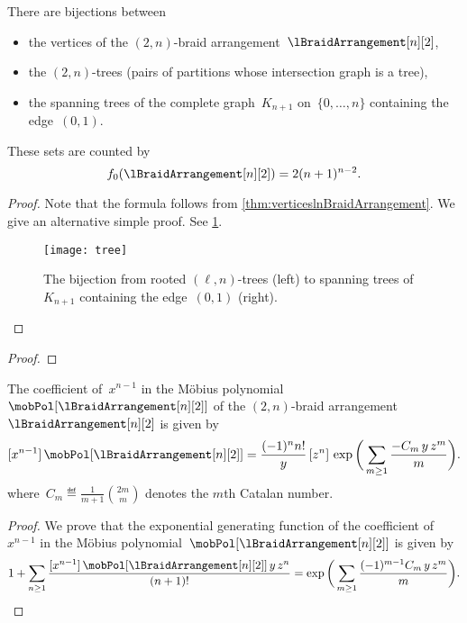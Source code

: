 \begin{theorem}
\label{thm:vertices2nBraidArrangement}
There are bijections between
\begin{itemize}
\item the vertices of the $(2,n)$-braid arrangement~$\lBraidArrangement[n][2]$,
\item the $(2,n)$-trees (\ie pairs of partitions whose intersection graph is a tree),
\item the spanning trees of the complete graph~$K_{n+1}$ on~$\{0, \dots, n\}$ containing the edge~$(0,1)$.
\end{itemize}
These sets are counted by
\[
f_0(\lBraidArrangement[n][2]) = 2 (n + 1)^{n-2}.
\]
\end{theorem}

\begin{proof}
Note that the formula follows from \cref{thm:verticeslnBraidArrangement}.
We give an alternative simple proof.
See \cref{fig:tree}.
%
\begin{figure}
	\centerline{\texttt{[image: tree]}}
	\caption{The bijection from rooted $(\ell,n)$-trees (left) to spanning trees of~$K_{n+1}$ containing the edge~$(0,1)$ (right).}
	\label{fig:tree}
\end{figure}
\end{proof}

\begin{theorem}
\label{thm:verticesRefinedlnBraidArrangement}
\end{theorem}

\begin{proof}
\end{proof}

\begin{theorem}
\label{thm:facets2nBraidArrangement}
The coefficient of~$x^{n-1}$ in the M\"obius polynomial~$\mobPol[{\lBraidArrangement[n][2]}]$ of the $(2,n)$-braid arrangement~$\lBraidArrangement[n][2]$ is given by
\[
[x^{n-1}] \, \mobPol[{\lBraidArrangement[n][2]}] = \frac{(-1)^n n!}{y} \, [z^n] \, \exp \bigg( \sum_{m \ge 1} \frac{- C_m \, y \, z^m}{m} \bigg).
\]
where~$\displaystyle C_m \eqdef \frac{1}{m+1} \binom{2m}{m}$ denotes the $m$th Catalan number.
\end{theorem}

\begin{proof}
We prove that the exponential generating function of the coefficient of~$x^{n-1}$ in the M\"obius polynomial~$\mobPol[{\lBraidArrangement[n][2]}]$ is given by
\[
1 + \sum_{n \ge 1} \frac{[x^{n-1}] \, \mobPol[{\lBraidArrangement[n][2]}] \, y \, z^n}{(n+1)!} = \exp \bigg( \sum_{m \ge 1} \frac{(-1)^{m-1} C_m \, y \, z^m}{m} \bigg).
\]
\end{proof}


